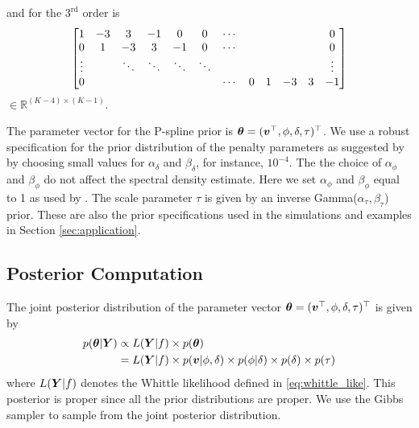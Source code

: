 \documentclass[twocolumn,final]{svjour3}
\newcommand{\bm}[1]{\mbox{\boldmath $#1$}}
\begin{document}
and for the $3^{\text{rd}}$ order is
\begin{align*}
\setcounter{MaxMatrixCols}{12} %
\begin{bmatrix}
1 & -3 &  3 & -1 &  0 & 0 & \cdots & & & & & 0 \\
0 &  1 & -3 &  3 & -1 & 0 & \cdots & & & & & 0 \\
\vdots &    & \ddots &  \ddots & \ddots & \ddots & &  & & & & \vdots \\
0 &   &  &   &  &  & \cdots & 0 & 1 & -3 & 3 & -1  
\end{bmatrix}
\end{align*}
$\in \mathbb{R}^{(K-4)\times (K-1)}$.  

The parameter vector for the P-spline prior is $\bm{\theta} = (\bm{v}^\top, \phi, \delta, \tau)^\top$.
We use a robust specification for the  prior distribution of the penalty parameters as suggested by \cite{Jullion:2007} by choosing small values for $\alpha_{\delta}$ and $\beta_{\delta}$, for instance, $10^{-4}$. The the choice of $\alpha_{\phi}$ and $\beta_{\phi}$ do not affect the spectral density estimate. Here we set $\alpha_{\phi}$ and $\beta_{\phi}$ equal to 1 as used by \cite{Bremhorst:2016}. The scale parameter $\tau$ is given by an inverse Gamma($\alpha_{\tau},\beta_{\tau}$) prior.  These are also the prior specifications used in the simulations and examples in Section \ref{sec:application}.




\subsection*{Posterior Computation}

The  joint posterior distribution of the parameter vector $\bm{\theta} = (\bm{v}^\top, \phi, \delta, \tau)^\top$ is given by
\begin{align*}
p(\bm{\theta}|\bm{Y}) & \propto L(\bm{Y}|f) \times p(\bm{\theta})  \\
&= L(\bm{Y}|f) \times p(\bm{v}|\phi, \delta) \times p(\phi|\delta) \times p(\delta) \times p(\tau)
\end{align*}
where $ L(\bm{Y}|f) $ denotes the Whittle likelihood defined in \eqref{eq:whittle_like}.
This posterior is proper since all the prior distributions are proper.  
We use the Gibbs sampler to sample from the joint posterior distribution.
\end{document}
